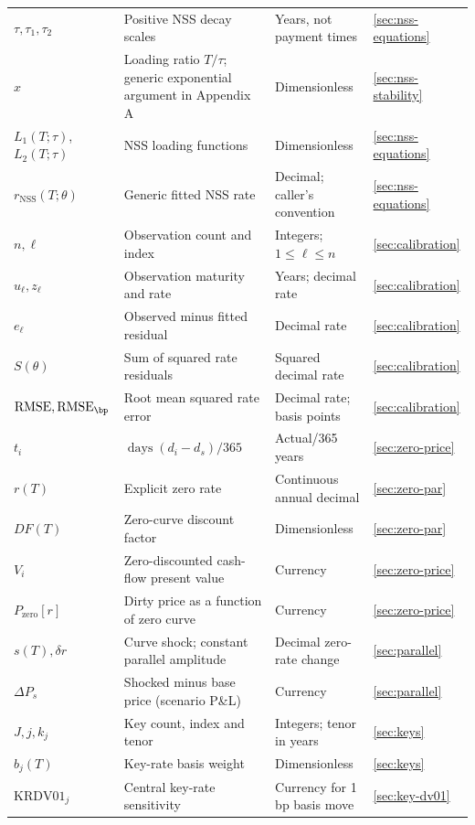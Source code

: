 \begin{longtable}{@{}L{0.18\textwidth}L{0.36\textwidth}L{0.18\textwidth}L{0.19\textwidth}@{}}
\(\tau,\tau_1,\tau_2\) & Positive NSS decay scales & Years, not payment times & \ref{sec:nss-equations}\\
\(x\) & Loading ratio \(T/\tau\); generic exponential argument in Appendix A & Dimensionless & \ref{sec:nss-stability}\\
\(L_1(T;\tau)\), \(L_2(T;\tau)\) & NSS loading functions & Dimensionless & \ref{sec:nss-equations}\\
\(r_{\mathrm{NSS}}(T;\theta)\) & Generic fitted NSS rate & Decimal; caller's convention & \ref{sec:nss-equations}\\
\(n,\ell\) & Observation count and index & Integers; \(1\leq\ell\leq n\) & \ref{sec:calibration}\\
\(u_\ell,z_\ell\) & Observation maturity and rate & Years; decimal rate & \ref{sec:calibration}\\
\(e_\ell\) & Observed minus fitted residual & Decimal rate & \ref{sec:calibration}\\
\(S(\theta)\) & Sum of squared rate residuals & Squared decimal rate & \ref{sec:calibration}\\
\(\mathrm{RMSE},\mathrm{RMSE}_{\bp}\) & Root mean squared rate error & Decimal rate; basis points & \ref{sec:calibration}\\
\(t_i\) & \(\operatorname{days}(d_i-d_s)/365\) & Actual/365 years & \ref{sec:zero-price}\\
\(r(T)\) & Explicit zero rate & Continuous annual decimal & \ref{sec:zero-par}\\
\(DF(T)\) & Zero-curve discount factor & Dimensionless & \ref{sec:zero-par}\\
\(V_i\) & Zero-discounted cash-flow present value & Currency & \ref{sec:zero-price}\\
\(P_{\mathrm{zero}}[r]\) & Dirty price as a function of zero curve & Currency & \ref{sec:zero-price}\\
\(s(T),\delta r\) & Curve shock; constant parallel amplitude & Decimal zero-rate change & \ref{sec:parallel}\\
\(\Delta P_s\) & Shocked minus base price (scenario P\&L) & Currency & \ref{sec:parallel}\\
\(J,j,k_j\) & Key count, index and tenor & Integers; tenor in years & \ref{sec:keys}\\
\(b_j(T)\) & Key-rate basis weight & Dimensionless & \ref{sec:keys}\\
\(\mathrm{KRDV01}_j\) & Central key-rate sensitivity & Currency for 1 bp basis move & \ref{sec:key-dv01}\\

\end{longtable}
